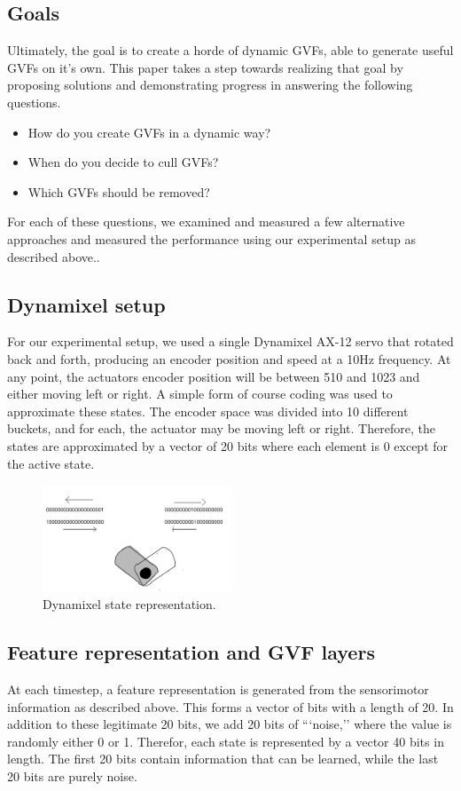 \documentclass[letterpaper]{article}
\begin{document}
\subsection{Goals}
Ultimately, the goal is to create a horde of dynamic GVFs, able to generate useful GVFs on it's own. This paper takes a step towards realizing that goal by proposing solutions and demonstrating progress in answering the following questions.
\begin{itemize}
  \item How do you create GVFs in a dynamic way?
  \item When do you decide to cull GVFs?
  \item Which GVFs should be removed?
\end{itemize}

For each of these questions, we examined and measured a few alternative approaches and measured the performance using our experimental setup as described above..

\subsection{Dynamixel setup}
For our experimental setup, we used a single Dynamixel AX-12 servo that rotated back and forth, producing an encoder position and speed at a 10Hz frequency. At any point, the actuators encoder position will be between 510 and 1023 and either moving left or right. A simple form of course coding was used to approximate these states. The encoder space was divided into 10 different buckets, and for each, the actuator may be moving left or right. Therefore, the states are approximated by a vector of 20 bits where each element is 0 except for the active state. 


\begin{figure}[H]
  \centerline{\includegraphics[width=0.5\textwidth]{Images/DynamixelFeatures.png}}
  \caption{Dynamixel state representation.}
  \label{fig:dynamixel}
\end{figure}

\subsection{Feature representation and GVF layers}
At each timestep, a feature representation is generated from the sensorimotor information as described above. This forms a vector of bits with a length of 20. In addition to these legitimate 20 bits, we add 20 bits of ```noise,'' where the value is randomly either 0 or 1. Therefor, each state is represented by a vector 40 bits in length. The first 20 bits contain information that can be learned, while the last 20 bits are purely noise. 
\end{document}
